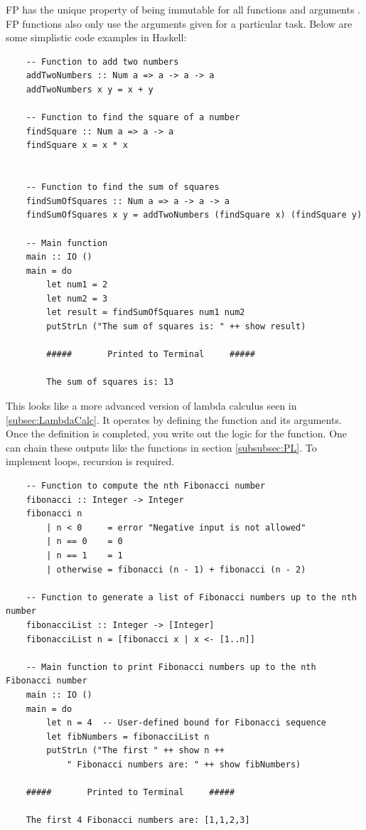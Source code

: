 FP has the unique property of being immutable for all functions and arguments \cite{FP1,FP2,RefTransp1,RefTransp2}.
FP functions also only use the arguments given for a particular task.
Below are some simplistic code examples in Haskell:

\begin{verbatim}
    -- Function to add two numbers
    addTwoNumbers :: Num a => a -> a -> a
    addTwoNumbers x y = x + y
    
    -- Function to find the square of a number
    findSquare :: Num a => a -> a
    findSquare x = x * x
    

    -- Function to find the sum of squares
    findSumOfSquares :: Num a => a -> a -> a
    findSumOfSquares x y = addTwoNumbers (findSquare x) (findSquare y)
    
    -- Main function
    main :: IO ()
    main = do
        let num1 = 2
        let num2 = 3
        let result = findSumOfSquares num1 num2
        putStrLn ("The sum of squares is: " ++ show result) 

        #####       Printed to Terminal     #####

        The sum of squares is: 13

\end{verbatim}

This looks like a more advanced version of lambda calculus seen in \ref{subsec:LambdaCalc}.
It operates by defining the function and its arguments.
Once the definition is completed, you write out the logic for the function.
One can chain these outputs like the functions in section \ref{subsubsec:PL}.
To implement loops, recursion is required.

\begin{verbatim}
    -- Function to compute the nth Fibonacci number
    fibonacci :: Integer -> Integer
    fibonacci n
        | n < 0     = error "Negative input is not allowed"
        | n == 0    = 0
        | n == 1    = 1
        | otherwise = fibonacci (n - 1) + fibonacci (n - 2)

    -- Function to generate a list of Fibonacci numbers up to the nth number
    fibonacciList :: Integer -> [Integer]
    fibonacciList n = [fibonacci x | x <- [1..n]]

    -- Main function to print Fibonacci numbers up to the nth Fibonacci number
    main :: IO ()
    main = do
        let n = 4  -- User-defined bound for Fibonacci sequence
        let fibNumbers = fibonacciList n
        putStrLn ("The first " ++ show n ++  
            " Fibonacci numbers are: " ++ show fibNumbers)

    #####       Printed to Terminal     #####

    The first 4 Fibonacci numbers are: [1,1,2,3]
\end{verbatim}

